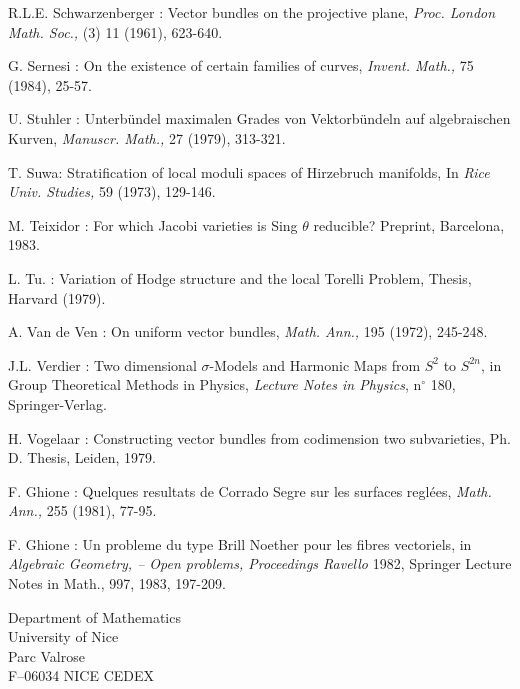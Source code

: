 \begin{thebibliography}{}
 R.L.E. Schwarzenberger : Vector bundles on the projective plane, {\em Proc. London Math. Soc.,} (3) 11 (1961), 623-640.

 G. Sernesi : On the existence of certain families of curves, {\em Invent. Math.,} 75 (1984), 25-57.

 U. Stuhler : Unterb\"undel maximalen Grades von Vektorb\"undeln auf algebraischen Kurven, {\em Manuscr. Math.,} 27 (1979), 313-321.

 T. Suwa\pageoriginale : Stratification of local moduli spaces of Hirzebruch manifolds, In {\em Rice Univ. Studies,} 59 (1973), 129-146.  

 M. Teixidor : For which Jacobi varieties is Sing $\theta$ reducible? Preprint, Barcelona, 1983.

 L. Tu. : Variation of Hodge structure and the local Torelli Problem, Thesis, Harvard (1979).

 A. Van de Ven : On uniform vector bundles, {\em Math. Ann.,} 195 (1972), 245-248.

 J.L. Verdier : Two dimensional $\sigma$-Models and Harmonic Maps from $S^{2}$ to $S^{2n}$, in Group Theoretical Methods in Physics, {\em Lecture Notes in Physics}, n$^{\circ}$ 180, Springer-Verlag.

 H. Vogelaar : Constructing vector bundles from codimension two subvarieties, Ph. D. Thesis, Leiden, 1979.

 F. Ghione : Quelques resultats de Corrado Segre sur les surfaces regl\'ees, {\em Math. Ann.,} 255 (1981), 77-95.

 F. Ghione : Un probleme du type Brill Noether pour les fibres vectoriels, in {\em Algebraic Geometry, -- Open problems, Proceedings Ravello} 1982, Springer Lecture Notes in Math., 997, 1983, 197-209.
\end{thebibliography}

\vskip 1cm

\noindent
Department of Mathematics\\
University of Nice\\
Parc Valrose\\
F--06034 NICE CEDEX

